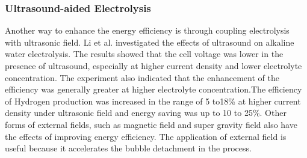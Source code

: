 \subsubsection{Ultrasound-aided Electrolysis}
Another way to enhance the energy efficiency is through coupling electrolysis with ultrasonic field. Li et al.\cite{ultrasound} investigated the effects of ultrasound on alkaline water electrolysis. The results showed that the cell voltage was lower in the presence of ultrasound,
especially at higher current density and lower electrolyte concentration. The experiment also indicated that the enhancement of the efficiency was generally greater at higher electrolyte concentration.The efficiency of Hydrogen production was increased in the range of 5 to18\% at higher current density under ultrasonic field and energy saving was up to 10 to 25\%. Other forms of external fields, such as magnetic field and super gravity field also have the effects of improving energy efficiency. The application of external field is useful because it accelerates the bubble detachment in the process. \cite{review}



